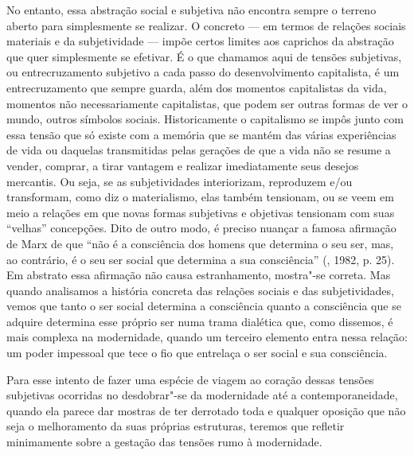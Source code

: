 No entanto, essa abstração social e subjetiva não encontra sempre o
terreno aberto para simplesmente se realizar. O concreto --- em termos de
relações sociais materiais e da subjetividade --- impõe certos limites
aos caprichos da abstração que quer simplesmente se efetivar. É o que
chamamos aqui de tensões subjetivas, ou entrecruzamento subjetivo a cada
passo do desenvolvimento capitalista, é um entrecruzamento que sempre
guarda, além dos momentos capitalistas da vida, momentos não
necessariamente capitalistas, que podem ser outras formas de ver o
mundo, outros símbolos sociais. Historicamente o capitalismo se impôs
junto com essa tensão que só existe com a memória que se mantém das
várias experiências de vida ou daquelas transmitidas pelas gerações de
que a vida não se resume a vender, comprar, a tirar vantagem e realizar
imediatamente seus desejos mercantis. Ou seja, se as subjetividades
interiorizam, reproduzem e/ou transformam, como diz o materialismo, elas
também tensionam, ou se veem em meio a relações em que novas formas
subjetivas e objetivas tensionam com suas ``velhas'' concepções. Dito de
outro modo, é preciso nuançar a famosa afirmação de Marx de que ``não é
a consciência dos homens que determina o seu ser, mas, ao contrário, é o
seu ser social que determina a sua consciência'' (, 1982, p. 25). Em
abstrato essa afirmação não causa estranhamento, mostra"-se correta. Mas
quando analisamos a história concreta das relações sociais e das
subjetividades, vemos que tanto o ser social determina a consciência
quanto a consciência que se adquire determina esse próprio ser numa
trama dialética que, como dissemos, é mais complexa na modernidade,
quando um terceiro elemento entra nessa relação: um poder impessoal que
tece o fio que entrelaça o ser social e sua consciência.

Para esse intento de fazer uma espécie de viagem ao coração dessas
tensões subjetivas ocorridas no desdobrar"-se da modernidade até a
contemporaneidade, quando ela parece dar mostras de ter derrotado toda e
qualquer oposição que não seja o melhoramento da suas próprias
estruturas, teremos que refletir minimamente sobre a gestação das
tensões rumo à modernidade.

